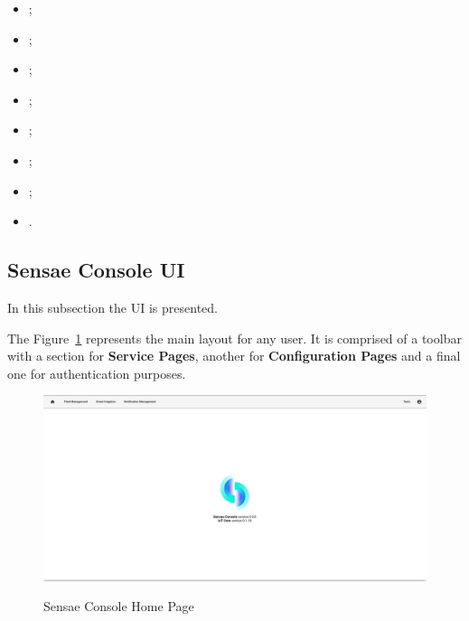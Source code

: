 \begin{itemize}
    \item {};
    \item {};
    \item {};
    \item {};
    \item {};
    \item {};
    \item {};
    \item {}.
\end{itemize}

\subsection{Sensae Console UI}
\label{subsec:implementation:description:ui}

In this subsection the \gls{UI} is presented.

The Figure~\ref{fig:implementation:description:ui:home} represents the main layout for any user. It is comprised of a toolbar with a section for \textbf{Service Pages}, another for \textbf{Configuration Pages} and a final one for authentication purposes.

\begin{figure}[H]
    \centering
    \resizebox{\columnwidth}{!}
    {
       \includegraphics{assets/figures/ui/home.png}
    }
    \caption[Sensae Console Home Page]{Sensae Console Home Page}
    \label{fig:implementation:description:ui:home}
\end{figure}


